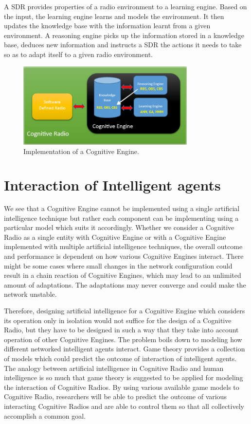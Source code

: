 \documentclass[conference]{IEEEtran}
\begin{document}
    A SDR provides properties of a radio environment to a learning engine. Based on the input, the learning engine learns and models the environment. It then updates the knowledge base with the information learnt from a given environment. A reasoning engine picks up the information stored in a knowledge base, deduces new information and instructs a SDR the actions it needs to take so as to adapt itself to a given radio environment.

\begin{figure}[!t]
\centering
\includegraphics[width=3.5in]{Figure_6}
\caption{Implementation of a Cognitive Engine.}
\label{fig_ce}
\end{figure}

\section{Interaction of Intelligent agents}
	 We see that a Cognitive Engine cannot be implemented using a single artificial intelligence technique but rather each component can be implementing using a particular model which suits it accordingly. Whether we consider a Cognitive Radio as a single entity with Cognitive Engine or with a Cognitive Engine implemented with multiple artificial intelligence techniques, the overall outcome and performance is dependent on how various Cognitive Engines interact. There might be some cases where small changes in the network configuration could result in a chain reaction of Cognitive Engines, which may lead to an unlimited amount of adaptations. The adaptations may never converge and could make the network unstable.

	Therefore, designing artificial intelligence for a Cognitive Engine which considers its operation only in isolation would not suffice for the design of a Cognitive Radio, but they have to be designed in such a way that they take into account operation of other Cognitive Engines. The problem boils down to modeling how different networked intelligent agents interact. Game theory provides a collection of models which could predict the outcome of interaction of intelligent agents. The analogy between artificial intelligence in Cognitive Radio and human intelligence is so much that game theory is suggested to be applied for modeling the interaction of Cognitive Radios. By using various available game models to Cognitive Radio, researchers will be able to predict the outcome of various interacting Cognitive Radios and are able to control them so that all collectively accomplish a common goal. 
\end{document}
